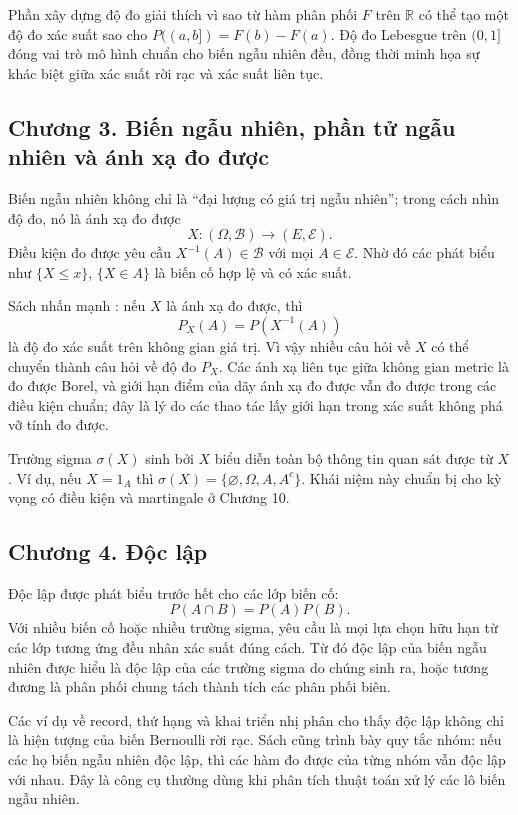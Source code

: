 \documentclass[11pt]{article}
\begin{document}
Phần xây dựng độ đo giải thích vì sao từ hàm phân phối \(F\) trên
\(\mathbb{R}\) có thể tạo một độ đo xác suất sao cho
\(P((a,b])=F(b)-F(a)\). Độ đo Lebesgue trên \((0,1]\) đóng vai trò mô hình
chuẩn cho biến ngẫu nhiên đều, đồng thời minh họa sự khác biệt giữa xác suất
rời rạc và xác suất liên tục.

\subsection*{Chương 3. Biến ngẫu nhiên, phần tử ngẫu nhiên và ánh xạ đo được}

Biến ngẫu nhiên không chỉ là ``đại lượng có giá trị ngẫu nhiên''; trong cách
nhìn độ đo, nó là ánh xạ đo được
\[
  X:(\Omega,\mathcal{B})\to(E,\mathcal{E}).
\]
Điều kiện đo được yêu cầu \(X^{-1}(A)\in\mathcal{B}\) với mọi
\(A\in\mathcal{E}\). Nhờ đó các phát biểu như \(\{X\le x\}\), \(\{X\in A\}\)
là biến cố hợp lệ và có xác suất.

Sách nhấn mạnh : nếu \(X\) là ánh xạ đo được, thì
\[
  P_X(A)=P(X^{-1}(A))
\]
là độ đo xác suất trên không gian giá trị. Vì vậy nhiều câu hỏi về \(X\) có
thể chuyển thành câu hỏi về độ đo \(P_X\). Các ánh xạ liên tục giữa không gian
metric là đo được Borel, và giới hạn điểm của dãy ánh xạ đo được vẫn đo được
trong các điều kiện chuẩn; đây là lý do các thao tác lấy giới hạn trong xác
suất không phá vỡ tính đo được.

Trường sigma \(\sigma(X)\) sinh bởi \(X\) biểu diễn toàn bộ thông tin quan sát
được từ \(X\). Ví dụ, nếu \(X=1_A\) thì \(\sigma(X)=\{\varnothing,\Omega,A,A^c\}\).
Khái niệm này chuẩn bị cho kỳ vọng có điều kiện và martingale ở Chương 10.

\subsection*{Chương 4. Độc lập}

Độc lập được phát biểu trước hết cho các lớp biến cố:
\[
  P(A\cap B)=P(A)P(B).
\]
Với nhiều biến cố hoặc nhiều trường sigma, yêu cầu là mọi lựa chọn hữu hạn từ
các lớp tương ứng đều nhân xác suất đúng cách. Từ đó độc lập của biến ngẫu
nhiên được hiểu là độc lập của các trường sigma do chúng sinh ra, hoặc tương
đương là phân phối chung tách thành tích các phân phối biên.

Các ví dụ về record, thứ hạng và khai triển nhị phân cho thấy độc lập không
chỉ là hiện tượng của biến Bernoulli rời rạc. Sách cũng trình bày quy tắc nhóm:
nếu các họ biến ngẫu nhiên độc lập, thì các hàm đo được của từng nhóm vẫn độc
lập với nhau. Đây là công cụ thường dùng khi phân tích thuật toán xử lý các lô
biến ngẫu nhiên.
\end{document}
